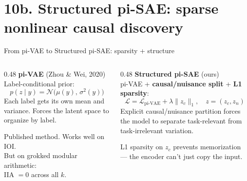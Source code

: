\documentclass[aspectratio=169,11pt]{beamer}
\begin{document}
\hypertarget{sec10b}{}
\section{10b. Structured pi-SAE: sparse nonlinear causal discovery}

\begin{frame}{From pi-VAE to Structured pi-SAE: sparsity + structure}

\begin{columns}[T]
\begin{column}{0.48\textwidth}
\textbf{pi-VAE} {\small (Zhou \& Wei, 2020)}\\[0.3em]
{\small Label-conditional prior:}
\vspace{-0.2em}
\[ p(z \mid y) = \mathcal{N}\!\bigl(\mu(y),\, \sigma^2(y)\bigr) \]
\vspace{-0.5em}
{\small Each label gets its own mean and variance. Forces the latent space to organize by label.}

\vspace{0.5em}
{\small Published method. Works well on IOI.\\[0.2em]
But on grokked modular arithmetic:\\
IIA $= 0$ across all $k$.}
\end{column}
\begin{column}{0.48\textwidth}
\textbf{Structured pi-SAE} {\small \textcolor{vae}{(ours)}}\\[0.3em]
{\small pi-VAE + \textbf{causal/nuisance split} + \textbf{L1 sparsity}:}
\vspace{-0.2em}
\[ \mathcal{L} = \mathcal{L}_\text{pi-VAE} + \lambda \|z_c\|_1, \quad z = (z_c, z_n) \]
\vspace{-0.5em}
{\small Explicit causal/nuisance partition forces the model to separate task-relevant from task-irrelevant variation.}

\vspace{0.3em}
{\small L1 sparsity on $z_c$ prevents memorization --- the encoder can't just copy the input.}
\end{column}
\end{columns}

\vspace{0.5em}
\centering
{}
\end{frame}
\end{document}
